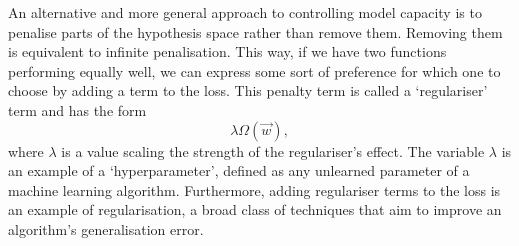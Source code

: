 An alternative and more general approach to controlling model capacity is to penalise parts of the hypothesis space rather than remove them. Removing them is equivalent to infinite penalisation. This way, if we have two functions performing equally well, we can express some sort of preference for which one to choose by adding a term to the loss. This penalty term is called a `regulariser' term \cite{DeepLearningBook} and has the form
\begin{equation}
    \lambda\Omega(\vec{w}),
\end{equation}
where $\lambda$ is a value scaling the strength of the regulariser's effect. The variable $\lambda$ is an example of a `hyperparameter', defined as any unlearned parameter of a machine learning algorithm. Furthermore, adding regulariser terms to the loss is an example of regularisation, a broad class of techniques that aim to improve an algorithm's generalisation error. 


